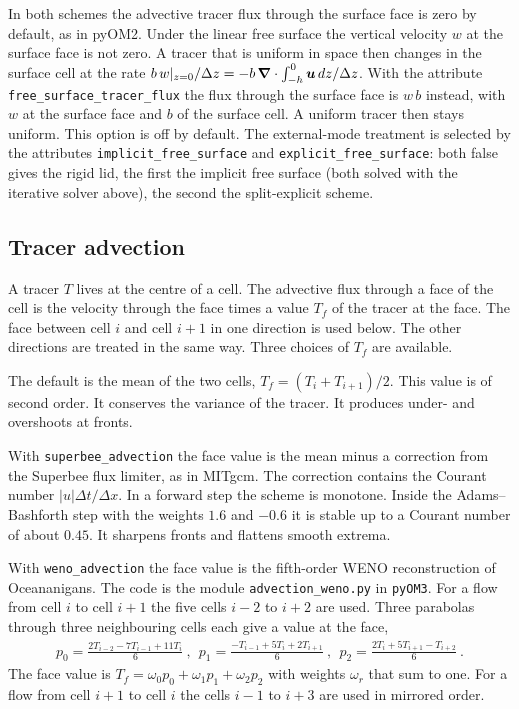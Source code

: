 \documentclass[12pt]{article}
\newcommand{\beeq}  { \begin{eqnarray*} }
\newcommand{\eeeq}  { \end{eqnarray*}}
\renewcommand{\v}[1]{{\mbox{\boldmath$ #1 $}}}  %
\newcommand{\vn}{{\v \nabla}}
\begin{document}
In both schemes the advective tracer flux through the surface face is zero by default, as in pyOM2.
Under the linear free surface the vertical velocity $w$ at the surface face is not zero.
A tracer that is uniform in space then changes in the surface cell at the rate $ b\, w|_{z=0} / \Delta z = - b\, \vn \cdot \int_{-h}^0 \v u\, dz / \Delta z$.
With the attribute \verb|free_surface_tracer_flux| the flux through the surface face is
$w\, b$ instead, with $w$ at the surface face and $b$ of the surface cell.
A uniform tracer then stays uniform.
This option is off by default.
The external-mode treatment is selected by the attributes
\verb|implicit_free_surface| and \verb|explicit_free_surface|: both false
gives the rigid lid, the first the implicit free surface (both solved with
the iterative solver above), the second the split-explicit scheme.

\subsection*{Tracer advection}

A tracer $T$ lives at the centre of a cell.
The advective flux through a face of the cell is the velocity through the face times a value $T_f$ of the tracer at the face.
The face between cell $i$ and cell $i+1$ in one direction is used below.
The other directions are treated in the same way.
Three choices of $T_f$ are available.

The default is the mean of the two cells, $T_f = (T_i + T_{i+1})/2$.
This value is of second order.
It conserves the variance of the tracer.
It produces under- and overshoots at fronts.

With \verb|superbee_advection| the face value is the mean minus a correction from the Superbee flux limiter, as in MITgcm.
The correction contains the Courant number $|u| \Delta t/\Delta x$.
In a forward step the scheme is monotone.
Inside the Adams--Bashforth step with the weights $1.6$ and $-0.6$ it is stable up to a Courant number of about $0.45$.
It sharpens fronts and flattens smooth extrema.

With \verb|weno_advection| the face value is the fifth-order WENO reconstruction of Oceananigans.
The code is the module \verb|advection_weno.py| in \verb|pyOM3|.
For a flow from cell $i$ to cell $i+1$ the five cells $i-2$ to $i+2$ are used.
Three parabolas through three neighbouring cells each give a value at the face,
\beeq
p_0 = \frac{2 T_{i-2} - 7 T_{i-1} + 11 T_i}{6} ~,~~
p_1 = \frac{- T_{i-1} + 5 T_i + 2 T_{i+1}}{6} ~,~~
p_2 = \frac{2 T_i + 5 T_{i+1} - T_{i+2}}{6} ~.
\eeeq
The face value is $T_f = \omega_0 p_0 + \omega_1 p_1 + \omega_2 p_2$ with weights $\omega_r$ that sum to one.
For a flow from cell $i+1$ to cell $i$ the cells $i-1$ to $i+3$ are used in mirrored order.
\end{document}
